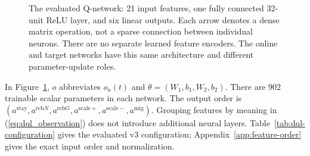 \documentclass[manuscript,nonacm]{acmart}
\begin{document}
\begin{figure}[!htbp]
\centering
{}
\caption{The evaluated Q-network: 21 input features, one fully connected
32-unit ReLU layer, and six linear outputs. Each arrow denotes a dense matrix
operation, not a sparse connection between individual neurons. There are no
separate learned feature encoders. The online and target networks have this
same architecture and different parameter-update roles.}
\label{fig:dql_q_network_tree}
\end{figure}

In Figure~\ref{fig:dql_q_network_tree}, $o$ abbreviates $o_u(t)$ and
$\theta=(W_1,b_1,W_2,b_2)$. There are $902$ trainable scalar parameters in
each network. The output order is
$(a^{\mathrm{stay}},a^{\mathrm{reb}N},a^{\mathrm{reb}G},
a^{\mathrm{scale}+},a^{\mathrm{scale}-},a^{\mathrm{mig}})$.
Grouping features by meaning in (\ref{eq:dql_observation}) does not introduce
additional neural layers. Table~\ref{tab:dql-configuration} gives the
evaluated v3 configuration; Appendix~\ref{app:feature-order} gives the exact
input order and normalization.
\end{document}
